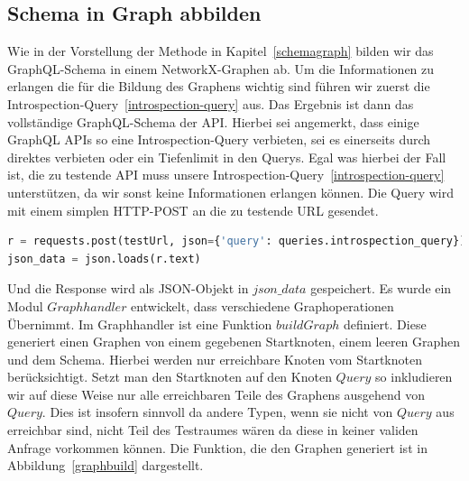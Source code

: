 \subsection{Schema in Graph abbilden}

Wie in der Vorstellung der Methode in Kapitel~\ref{schemagraph} bilden wir das GraphQL-Schema in einem NetworkX-Graphen ab.
Um die Informationen zu erlangen die für die Bildung des Graphens wichtig sind führen wir zuerst die Introspection-Query~\ref{introspection-query} aus.
Das Ergebnis ist dann das vollständige GraphQL-Schema der API.
Hierbei sei angemerkt, dass einige GraphQL APIs so eine Introspection-Query verbieten, sei es einerseits durch direktes verbieten oder ein Tiefenlimit in den Querys.
Egal was hierbei der Fall ist, die zu testende API muss unsere Introspection-Query~\ref{introspection-query} unterstützen, da wir sonst keine Informationen erlangen können.
Die Query wird mit einem simplen HTTP-POST an die zu testende URL gesendet.

\begin{lstlisting}[language=Python]
r = requests.post(testUrl, json={'query': queries.introspection_query})
json_data = json.loads(r.text)
\end{lstlisting}

Und die Response wird als JSON-Objekt in $json\_data$ gespeichert.
Es wurde ein Modul $Graphhandler$ entwickelt, dass verschiedene Graphoperationen Übernimmt.
Im Graphhandler ist eine Funktion $buildGraph$ definiert.
Diese generiert einen Graphen von einem gegebenen Startknoten, einem leeren Graphen und dem Schema.
Hierbei werden nur erreichbare Knoten vom Startknoten berücksichtigt.
Setzt man den Startknoten auf den Knoten $Query$ so inkludieren wir auf diese Weise nur alle erreichbaren Teile des Graphens ausgehend von $Query$.
Dies ist insofern sinnvoll da andere Typen, wenn sie nicht von $Query$ aus erreichbar sind, nicht Teil des Testraumes wären da diese in keiner validen Anfrage vorkommen können.
Die Funktion, die den Graphen generiert ist in Abbildung~\ref{graphbuild} dargestellt.

